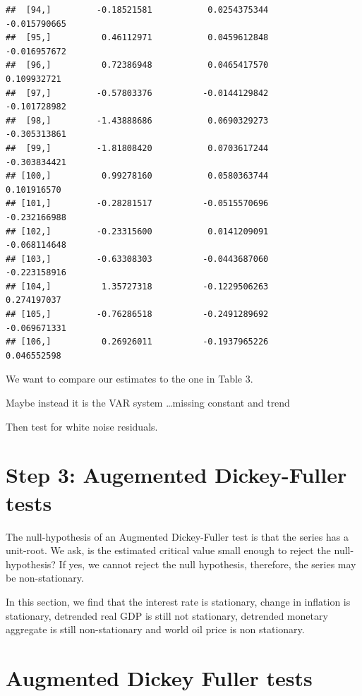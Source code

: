 \documentclass[11pt,preprint, authoryear]{elsarticle}
\numberwithin{equation}{section}
\numberwithin{figure}{section}
\numberwithin{table}{section}
\begin{document}
\begin{verbatim}
##  [94,]         -0.18521581           0.0254375344            -0.015790665
##  [95,]          0.46112971           0.0459612848            -0.016957672
##  [96,]          0.72386948           0.0465417570             0.109932721
##  [97,]         -0.57803376          -0.0144129842            -0.101728982
##  [98,]         -1.43888686           0.0690329273            -0.305313861
##  [99,]         -1.81808420           0.0703617244            -0.303834421
## [100,]          0.99278160           0.0580363744             0.101916570
## [101,]         -0.28281517          -0.0515570696            -0.232166988
## [102,]         -0.23315600           0.0141209091            -0.068114648
## [103,]         -0.63308303          -0.0443687060            -0.223158916
## [104,]          1.35727318          -0.1229506263             0.274197037
## [105,]         -0.76286518          -0.2491289692            -0.069671331
## [106,]          0.26926011          -0.1937965226             0.046552598
\end{verbatim}

We want to compare our estimates to the one in Table 3.

Maybe instead it is the VAR system \ldots missing constant and trend

Then test for white noise residuals.

\hypertarget{step-3-augemented-dickey-fuller-tests}{%
\section{Step 3: Augemented Dickey-Fuller
tests}\label{step-3-augemented-dickey-fuller-tests}}

The null-hypothesis of an Augmented Dickey-Fuller test is that the
series has a unit-root. We ask, is the estimated critical value small
enough to reject the null-hypothesis? If yes, we cannot reject the null
hypothesis, therefore, the series may be non-stationary.

In this section, we find that the interest rate is stationary, change in
inflation is stationary, detrended real GDP is still not stationary,
detrended monetary aggregate is still non-stationary and world oil price
is non stationary.

\hypertarget{augmented-dickey-fuller-tests}{%
\section{Augmented Dickey Fuller
tests}\label{augmented-dickey-fuller-tests}}
\end{document}
